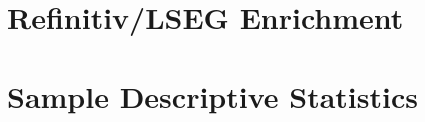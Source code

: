 \documentclass[12pt,a4paper,oneside]{report}
\begin{document}
\section{Refinitiv/LSEG Enrichment}
\label{sec:refinitiv}

\section{Sample Descriptive Statistics}
\label{sec:descriptives}
\end{document}
